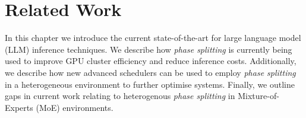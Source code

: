 \graphicspath{{chapters/03related/graphics}}

\chapter{Related Work}


In this chapter we introduce the current state-of-the-art for large language model (LLM) inference techniques.
We describe how \textit{phase splitting} is currently being used to improve GPU cluster efficiency and reduce inference costs.
Additionally, we describe how new advanced schedulers can be used to employ \textit{phase splitting} in a heterogeneous environment to further optimise systems.
Finally, we outline gaps in current work relating to heterogenous \textit{phase splitting} in Mixture-of-Experts (MoE) environments.

%
%

